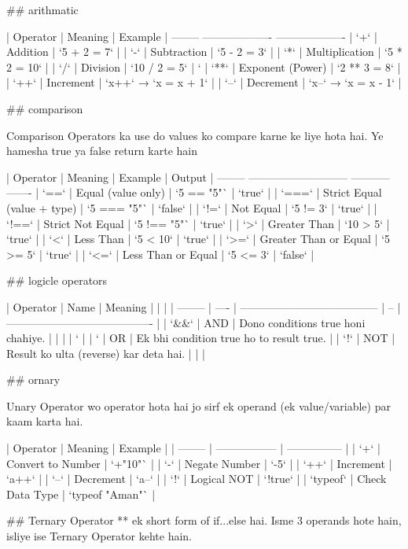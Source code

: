 ## arithmatic 

| Operator | Meaning             | Example             |
  --------   -------------------   ------------------- 
| `+`      | Addition            | `5 + 2 = 7`         |
| `-`      | Subtraction         | `5 - 2 = 3`         |
| `*`      | Multiplication      | `5 * 2 = 10`        |
| `/`      | Division            | `10 / 2 = 5`        |
 `%
| `**`     | Exponent (Power)    | `2 ** 3 = 8`        |
| `++`     | Increment           | `x++` → `x = x + 1` |
| `--`     | Decrement           | `x--` → `x = x - 1` |

## comparison

Comparison Operators ka use do values ko compare karne ke liye hota hai.
Ye hamesha true ya false return karte hain

| Operator | Meaning                     | Example     | Output  |
 --------   ---------------------------    -----------   ------- 
| `==`     | Equal (value only)          | `5 == "5"`  | `true`  |
| `===`    | Strict Equal (value + type) | `5 === "5"` | `false` |
| `!=`     | Not Equal                   | `5 != 3`    | `true`  |
| `!==`    | Strict Not Equal            | `5 !== "5"` | `true`  |
| `>`      | Greater Than                | `10 > 5`    | `true`  |
| `<`      | Less Than                   | `5 < 10`    | `true`  |
| `>=`     | Greater Than or Equal       | `5 >= 5`    | `true`  |
| `<=`     | Less Than or Equal          | `5 <= 3`    | `false` |

## logicle operators 

| Operator | Name | Meaning                                |    |                                          |
| -------- | ---- | -------------------------------------- | -- | ---------------------------------------- |
| `&&`     | AND  | Dono conditions true honi chahiye.     |    |                                          |
| `        |      | `                                      | OR | Ek bhi condition true ho to result true. |
| `!`      | NOT  | Result ko ulta (reverse) kar deta hai. |    |                                          |

## ornary 

Unary Operator wo operator hota hai jo sirf ek operand (ek value/variable)
 par kaam karta hai.

 | Operator | Meaning           | Example         |
| -------- | ----------------- | --------------- |
| `+`      | Convert to Number | `+"10"`         |
| `-`      | Negate Number     | `-5`            |
| `++`     | Increment         | `a++`           |
| `--`     | Decrement         | `a--`           |
| `!`      | Logical NOT       | `!true`         |
| `typeof` | Check Data Type   | `typeof "Aman"` |

## Ternary Operator ** ek short form of if...else hai.
Isme 3 operands hote hain, isliye ise Ternary Operator kehte hain.